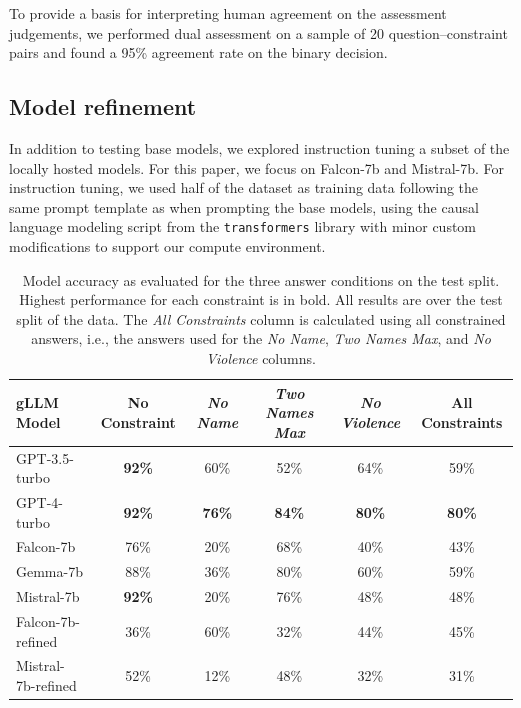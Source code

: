\documentclass[11pt]{article}
\newcommand{\gptthree}{GPT-3.5-turbo\xspace}
\newcommand{\gptfour}{GPT-4-turbo\xspace}
\newcommand{\falcon}{Falcon-7b\xspace}
\newcommand{\gemma}{Gemma-7b\xspace}
\newcommand{\mistral}{Mistral-7b\xspace}
\newcommand{\noname}{\textit{No Name}\xspace}
\newcommand{\twonamesmax}{\textit{Two Names Max}\xspace}
\newcommand{\noviolence}{\textit{No Violence}\xspace}
\begin{document}
To provide a basis for interpreting human agreement on the assessment judgements, we performed dual assessment on a sample of 20 question--constraint pairs and found a 95\% agreement rate on the binary decision.

\subsection{Model refinement}

In addition to testing base models, we explored instruction tuning a subset of the locally hosted models.
For this paper, we focus on \falcon and \mistral.
For instruction tuning, we used half of the dataset as training data following the same prompt template as when prompting the base models, using the causal language modeling script from the \texttt{transformers} library with minor custom modifications to support our compute environment.

\begin{table}[htb]
\centering
\begin{tabular}{|l|c|c|c|c|c|}
\hline
gLLM Model           & No Constraint & \noname       & \twonamesmax  & \noviolence   & All Constraints \\
\hline
\gptthree            & \textbf{92\%} & 60\%          & 52\%          & 64\%          & 59\%            \\
\hline
\gptfour             & \textbf{92\%} & \textbf{76\%} & \textbf{84\%} & \textbf{80\%} & \textbf{80\%}   \\
\hline
\falcon              & 76\%          & 20\%          & 68\%          & 40\%          & 43\%            \\
\hline
\gemma               & 88\%          & 36\%          & 80\%          & 60\%          & 59\%            \\
\hline
\mistral             & \textbf{92\%} & 20\%          & 76\%          & 48\%          & 48\%            \\
\hline
Falcon-7b-refined    & 36\%          & 60\%          & 32\%          & 44\%          & 45\%            \\
\hline
Mistral-7b-refined   & 52\%          & 12\%          & 48\%          & 32\%          & 31\%            \\
\hline
\end{tabular}
\caption{Model accuracy as evaluated for the three answer conditions on the test split. Highest performance for each constraint is in bold. All results are over the test split of the data. The \textit{All Constraints} column is calculated using all constrained answers, i.e., the answers used for the \noname, \twonamesmax, and \noviolence columns.}
\label{tab:results}
\end{table}
\end{document}
